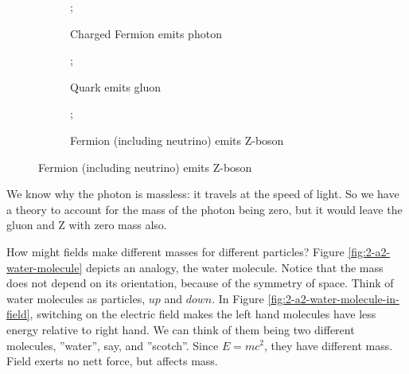 \documentclass[]{article}
\begin{document}
\begin{figure}[H]
	\caption{Some processes from the Standard Model (not exhaustive)}\label{fig:sm:processes}
	\begin{subfigure}[t]{0.3\textwidth}
		\caption{Charged Fermion emits photon}
		;
	\end{subfigure}
	\hfill
	\begin{subfigure}[t]{0.3\textwidth}
		\caption{Quark emits gluon}
		;
	\end{subfigure}
	\hfill
	\begin{subfigure}[t]{0.3\textwidth}
		\caption{Fermion (including neutrino) emits Z-boson}
		;
	\end{subfigure}
\end{figure} 

We know why the photon is massless: it travels at the speed of light. So we have a theory to account for the mass of the photon being zero, but it would leave the gluon and Z with zero mass also.

How might fields make different masses for different particles? Figure \ref{fig:2-a2-water-molecule} depicts an analogy, the water molecule. Notice that the mass does not depend on its orientation, because of the symmetry of space. Think of water molecules as particles, $up$ and $down$. In Figure \ref{fig:2-a2-water-molecule-in-field}, switching on the electric field makes the left hand molecules have less energy relative to right hand. We can think of them being two different molecules, ''water'', say, and ''scotch''. Since $E=mc^2$, they have different mass. Field exerts no nett force, but affects mass.  
\end{document}
